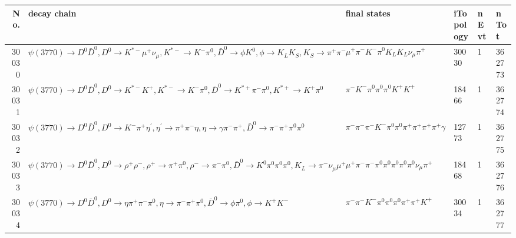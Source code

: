 \begin{table}[htbp] 
\begin{center}
\begin{small}
\begin{tabular}{rlllll}\hline\hline
 No. & decay chain & final states &  iTopology & nEvt & nTot \\\hline
30030&$\psi(3770) \rightarrow D^{0} \bar{D}^{0} , D^{0}  \rightarrow K^{*-}         \mu^{+}      \nu_{\mu}         , K^{*-}          \rightarrow K^{-}          \pi^{0}        , \bar{D}^{0}  \rightarrow \phi           K^{0}          , \phi            \rightarrow K_{L}          K_{S}          , K_{S}           \rightarrow \pi^{+}        \pi^{-}        $&$\mu^{+}      \pi^{-}        K^{-}          \pi^{0}        K_{L}          K_{L}          \nu_{\mu}         \pi^{+}        $&30030&    1&362773\\
30031&$\psi(3770) \rightarrow D^{0} \bar{D}^{0} , D^{0}  \rightarrow K^{*-}         K^{+}          , K^{*-}          \rightarrow K^{-}          \pi^{0}        , \bar{D}^{0}  \rightarrow K^{*+}         \pi^{-}        \pi^{0}        , K^{*+}          \rightarrow K^{+}          \pi^{0}        $&$\pi^{-}        K^{-}          \pi^{0}        \pi^{0}        \pi^{0}        K^{+}          K^{+}          $&18466&    1&362774\\
30032&$\psi(3770) \rightarrow D^{0} \bar{D}^{0} , D^{0}  \rightarrow K^{-}          \pi^{+}        \eta^{\prime} , \eta^{\prime}  \rightarrow \pi^{+}        \pi^{-}        \eta          , \eta           \rightarrow \gamma       \pi^{-}        \pi^{+}        , \bar{D}^{0}  \rightarrow \pi^{-}        \pi^{+}        \pi^{0}        \pi^{0}        $&$\pi^{-}        \pi^{-}        \pi^{-}        K^{-}          \pi^{0}        \pi^{0}        \pi^{+}        \pi^{+}        \pi^{+}        \pi^{+}        \gamma       $&12773&    1&362775\\
30033&$\psi(3770) \rightarrow D^{0} \bar{D}^{0} , D^{0}  \rightarrow \rho^{+}      \rho^{-}      , \rho^{+}       \rightarrow \pi^{+}        \pi^{0}        , \rho^{-}       \rightarrow \pi^{-}        \pi^{0}        , \bar{D}^{0}  \rightarrow K^{0}          \pi^{0}        \pi^{0}        \pi^{0}        , K_{L}           \rightarrow \pi^{-}        \nu_{\mu}         \mu^{+}      $&$\mu^{+}      \pi^{-}        \pi^{-}        \pi^{0}        \pi^{0}        \pi^{0}        \pi^{0}        \pi^{0}        \nu_{\mu}         \pi^{+}        $&18468&    1&362776\\
30034&$\psi(3770) \rightarrow D^{0} \bar{D}^{0} , D^{0}  \rightarrow \eta          \pi^{+}        \pi^{-}        \pi^{0}        , \eta           \rightarrow \pi^{-}        \pi^{+}        \pi^{0}        , \bar{D}^{0}  \rightarrow \phi           \pi^{0}        , \phi            \rightarrow K^{+}          K^{-}          $&$\pi^{-}        \pi^{-}        K^{-}          \pi^{0}        \pi^{0}        \pi^{0}        \pi^{+}        \pi^{+}        K^{+}          $&30034&    1&362777\\

\end{tabular}
\end{small}
\end{center}
\end{table}
